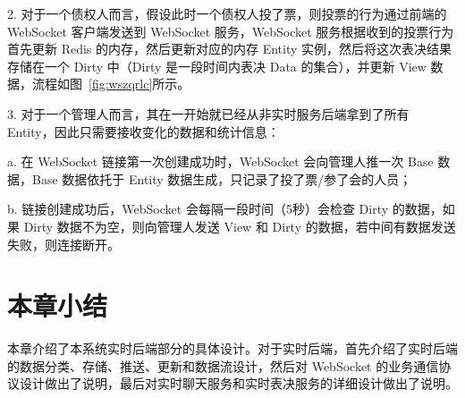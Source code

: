   2. 对于一个债权人而言，假设此时一个债权人投了票，则投票的行为通过前端的 WebSocket 客户端发送到 WebSocket 服务，WebSocket 服务根据收到的投票行为首先更新 Redis 的内存，然后更新对应的内存 Entity 实例，然后将这次表决结果存储在一个 Dirty 中（Dirty 是一段时间内表决 Data 的集合），并更新 View 数据，流程如图~\ref{fig:wszqrlc}所示。

  3. 对于一个管理人而言，其在一开始就已经从非实时服务后端拿到了所有 Entity，因此只需要接收变化的数据和统计信息：

  \quad{}\quad{}a. 在 WebSocket 链接第一次创建成功时，WebSocket 会向管理人推一次 Base 数据，Base 数据依托于 Entity 数据生成，只记录了投了票/参了会的人员；

  \quad{}\quad{}b. 链接创建成功后，WebSocket 会每隔一段时间（5秒）会检查 Dirty 的数据，如果 Dirty 数据不为空，则向管理人发送 View 和 Dirty 的数据，若中间有数据发送失败，则连接断开。

  \section{本章小结}
  本章介绍了本系统实时后端部分的具体设计。对于实时后端，首先介绍了实时后端的数据分类、存储、推送、更新和数据流设计，然后对 WebSocket 的业务通信协议设计做出了说明，最后对实时聊天服务和实时表决服务的详细设计做出了说明。